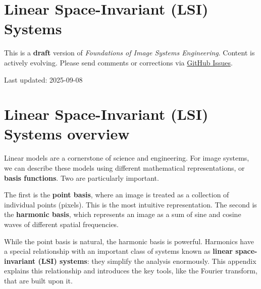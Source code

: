 \documentclass[
  letterpaper,
]{book}
\begin{document}
\chapter{Linear Space-Invariant (LSI)
Systems}\label{sec-appendix-spaceinvariance}

\begin{tcolorbox}[enhanced jigsaw, opacityback=0, breakable, coltitle=black, leftrule=.75mm, left=2mm, colframe=quarto-callout-warning-color-frame, opacitybacktitle=0.6, bottomtitle=1mm, bottomrule=.15mm, toprule=.15mm, title=\textcolor{quarto-callout-warning-color}{\faExclamationTriangle}\hspace{0.5em}{Work in Progress}, titlerule=0mm, toptitle=1mm, colback=white, rightrule=.15mm, colbacktitle=quarto-callout-warning-color!10!white, arc=.35mm]

This is a \textbf{draft} version of \emph{Foundations of Image Systems
Engineering}. Content is actively evolving. Please send comments or
corrections via \href{https://github.com/wandell/FISE-git/issues}{GitHub
Issues}.

Last updated: 2025-09-08

\end{tcolorbox}

\chapter{Linear Space-Invariant (LSI) Systems
overview}\label{sec-appendix-spaceinvariance-overview}

Linear models are a cornerstone of science and engineering. For image
systems, we can describe these models using different mathematical
representations, or \textbf{basis functions}. Two are particularly
important.

The first is the \textbf{point basis}, where an image is treated as a
collection of individual points (pixels). This is the most intuitive
representation. The second is the \textbf{harmonic basis}, which
represents an image as a sum of sine and cosine waves of different
spatial frequencies.

While the point basis is natural, the harmonic basis is powerful.
Harmonics have a special relationship with an important class of systems
known as \textbf{linear space-invariant (LSI) systems}: they simplify
the analysis enormously. This appendix explains this relationship and
introduces the key tools, like the Fourier transform, that are built
upon it.
\end{document}
